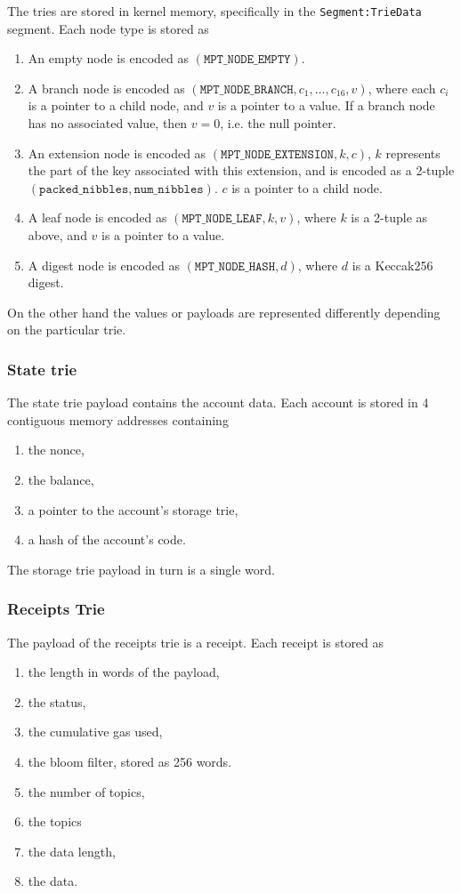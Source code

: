 The tries are stored in kernel memory, specifically in the {\tt Segment:TrieData} segment. Each node type is stored as
\begin{enumerate}
  \item An empty node is encoded as $(\texttt{MPT\_NODE\_EMPTY})$.
  \item A branch node is encoded as $(\texttt{MPT\_NODE\_BRANCH}, c_1, \dots, c_{16}, v)$, where each $c_i$ is a pointer to a child node, and $v$ is a pointer to a value. If a branch node has no associated value, then $v = 0$, i.e. the null pointer.
  \item An extension node is encoded as $(\texttt{MPT\_NODE\_EXTENSION}, k, c)$, $k$ represents the part of the key associated with this extension, and is encoded as a 2-tuple $(\texttt{packed\_nibbles}, \texttt{num\_nibbles})$. $c$ is a pointer to a child node.
  \item A leaf node is encoded as $(\texttt{MPT\_NODE\_LEAF}, k, v)$, where $k$ is a 2-tuple as above, and $v$ is a pointer to a value.
  \item A digest node is encoded as $(\texttt{MPT\_NODE\_HASH}, d)$, where $d$ is a Keccak256 digest.
\end{enumerate}

On the other hand the values or payloads are represented differently depending on the particular trie.

\subsubsection{State trie}
The state trie payload contains the account data. Each account is stored in 4 contiguous memory addresses containing
\begin{enumerate}
	\item the nonce,
	\item the balance,
	\item a pointer to the account's storage trie,
	\item a hash of the account's code.
\end{enumerate}
The storage trie payload in turn is a single word.

\subsubsection{Receipts Trie}
The payload of the receipts trie is a receipt. Each receipt is stored as
\begin{enumerate}
	\item the length in words of the payload,
	\item the status,
	\item the cumulative gas used,
	\item the bloom filter, stored as 256 words.
	\item the number of topics,
	\item the topics
	\item the data length,
	\item the data.
\end{enumerate}


